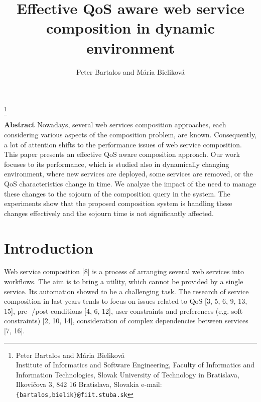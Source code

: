 \documentclass[11pt]{llncs}
\begin{document}
\title{Effective QoS aware web service composition in dynamic environment}
\date{}
\institute{}
\author{Peter Bartalos and  Mária Bieliková\vspace{100pt}}

\maketitle



\let\thefootnote\relax\footnote{Peter Bartalos and Mária Bieliková\\
Institute of Informatics and Software Engineering, Faculty of Informatics and Information Technologies,
Slovak University of Technology in Bratislava, Ilkovičova 3, 842 16 Bratislava, Slovakia
e-mail: \texttt{\{bartalos,bielik\}@fiit.stuba.sk} }        

\setlength{\skip\footins}{2em}

\fancyhead{}
\fancyfoot{}
\fancyhead[LE]{\small \thepage}
\fancyhead[RO]{\small \thepage}
\renewcommand{\headrulewidth}{0pt}
\pagestyle{fancy}

{
\noindent
\textbf{Abstract} Nowadays, several web services composition approaches, each considering
various aspects of the composition problem, are known. Consequently, a lot of
attention shifts to the performance issues of web service composition. This paper
presents an effective QoS aware composition approach. Our work focuses to its performance,
which is studied also in dynamically changing environment, where new
services are deployed, some services are removed, or the QoS characteristics change
in time. We analyze the impact of the need to manage these changes to the sojourn
of the composition query in the system. The experiments show that the proposed
composition system is handling these changes effectively and the sojourn time is
not significantly affected.
}
\\

\section{Introduction}

Web service composition [8] is a process of arranging several web services into
workflows. The aim is to bring a utility, which cannot be provided by a single service.
Its automation showed to be a challenging task. The research of service composition
in last years tends to focus on issues related to QoS [3, 5, 6, 9, 13, 15], pre-
/post-conditions [4, 6, 12], user constraints and preferences (e.g. soft constraints)
[2, 10, 14], consideration of complex dependencies between services [7, 16].
\end{document}

